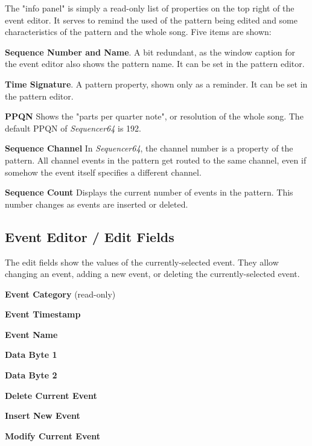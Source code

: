    The "info panel" is simply a read-only list of properties on the top right
   of the event editor.  It serves to remind the used of the pattern being
   edited and some characteristics of the pattern and the whole song.
   Five items are shown:

   \begin{enumber}
      \item \textbf{Sequence Number and Name}.
         A bit redundant, as the window caption for the event editor
         also shows the pattern name.
         It can be set in the pattern editor.
      \item \textbf{Time Signature}.
         A pattern property, shown only as a reminder.
         It can be set in the pattern editor.
      \item \textbf{PPQN}
         Shows the "parts per quarter note", or resolution of the
         whole song.  The default PPQN of \textsl{Sequencer64} is 192.
      \item \textbf{Sequence Channel}
         In \textsl{Sequencer64}, the channel number is a property of the
         pattern.  All channel events in the pattern get routed to the same
         channel, even if somehow the event itself specifies a different
         channel.
      \item \textbf{Sequence Count}
         Displays the current number of events in the pattern.
         This number changes as events are inserted or deleted.
   \end{enumber}

\subsection{Event Editor / Edit Fields}
\label{subsec:seq64_event_editor_fields}

   The edit fields show the values of the currently-selected event.  They allow
   changing an event, adding a new event, or deleting the currently-selected
   event.

   \begin{enumber}
      \item \textbf{Event Category} (read-only)
      \item \textbf{Event Timestamp}
      \item \textbf{Event Name}
      \item \textbf{Data Byte 1}
      \item \textbf{Data Byte 2}
      \item \textbf{Delete Current Event}
      \item \textbf{Insert New Event}
      \item \textbf{Modify Current Event}
   \end{enumber}

